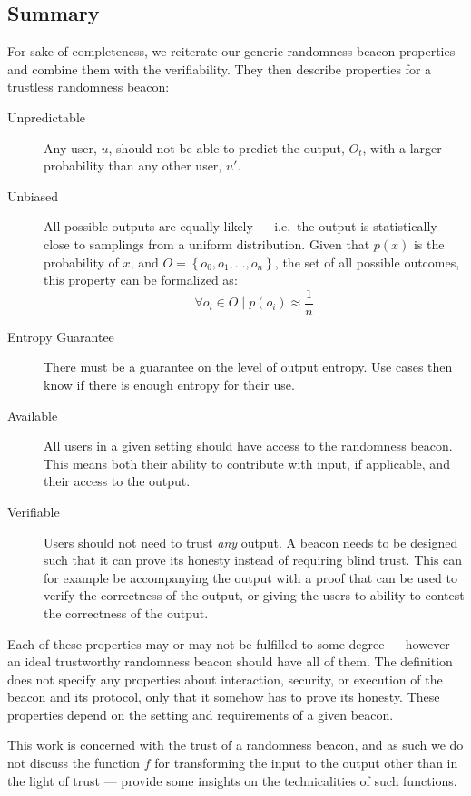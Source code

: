 \subsection{Summary}

For sake of completeness, we reiterate our generic randomness beacon properties and combine them with the verifiability.
They then describe properties for a trustless randomness beacon:

\begin{description}
    \item[Unpredictable]
        Any user, $u$, should not be able to predict the output, $O_t$, with a larger probability than any other user, $u'$.
    \item[Unbiased]
        All possible outputs are equally likely --- i.e.\ the output is statistically close to samplings from a uniform distribution.
        Given that $p(x)$ is the probability of $x$, and $O = \left\{ {o_0, o_1, \ldots, o_n} \right\}$, the set of all possible outcomes, this property can be formalized as:
        $$ \forall o_i \in O \mid p(o_i) \approx \frac{1}{n}$$
    \item[Entropy Guarantee]
        There must be a guarantee on the level of output entropy.
        Use cases then know if there is enough entropy for their use.
    \item[Available]
        All users in a given setting should have access to the randomness beacon.
        This means both their ability to contribute with input, if applicable, and their access to the output.
    \item[Verifiable]
        Users should not need to trust \emph{any} output.
        A beacon needs to be designed such that it can prove its honesty instead of requiring blind trust.
        This can for example be accompanying the output with a proof that can be used to verify the correctness of the output, or giving the users to ability to contest the correctness of the output.
\end{description}

Each of these properties may or may not be fulfilled to some degree --- however an ideal trustworthy randomness beacon should have all of them.
The definition does not specify any properties about interaction, security, or execution of the beacon and its protocol, only that it somehow has to prove its honesty.
These properties depend on the setting and requirements of a given beacon.

This work is concerned with the trust of a randomness beacon, and as such we do not discuss the function $f$ for transforming the input to the output other than in the light of trust --- \citet{bonneau2015bitcoin, dodis2004randomness} provide some insights on the technicalities of such functions.
